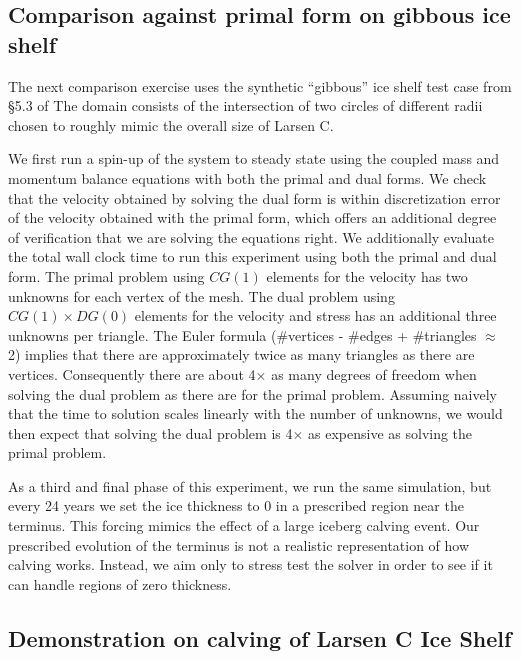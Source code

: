 \documentclass[review,oneside]{igs}
\begin{document}
\subsection{Comparison against primal form on gibbous ice shelf}

The next comparison exercise uses the synthetic ``gibbous'' ice shelf test case from \S5.3 of \citet{shapero2021icepack}
The domain consists of the intersection of two circles of different radii chosen to roughly mimic the overall size of Larsen C.

We first run a spin-up of the system to steady state using the coupled mass and momentum balance equations with both the primal and dual forms.
We check that the velocity obtained by solving the dual form is within discretization error of the velocity obtained with the primal form, which offers an additional degree of verification that we are solving the equations right.
We additionally evaluate the total wall clock time to run this experiment using both the primal and dual form.
The primal problem using $CG(1)$ elements for the velocity has two unknowns for each vertex of the mesh.
The dual problem using $CG(1) \times DG(0)$ elements for the velocity and stress has an additional three unknowns per triangle.
The Euler formula (\#vertices - \#edges + \#triangles $\approx$ 2) implies that there are approximately twice as many triangles as there are vertices.
Consequently there are about 4$\times$ as many degrees of freedom when solving the dual problem as there are for the primal problem.
Assuming naively that the time to solution scales linearly with the number of unknowns, we would then expect that solving the dual problem is 4$\times$ as expensive as solving the primal problem.

As a third and final phase of this experiment, we run the same simulation, but every 24 years we set the ice thickness to 0 in a prescribed region near the terminus.
This forcing mimics the effect of a large iceberg calving event.
Our prescribed evolution of the terminus is not a realistic representation of how calving works.
Instead, we aim only to stress test the solver in order to see if it can handle regions of zero thickness.


\subsection{Demonstration on calving of Larsen C Ice Shelf}
\end{document}
